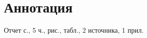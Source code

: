 
\chapter*{Аннотация}

    Отчет \pageref{LastPage} с., %
    5 ч.,                        %
    \totalfigures{} рис.,        %
    \totaltables{} табл.,        %
    2 источника,                 %
    1 прил.                      %
    
    \lipsum[1]
    
